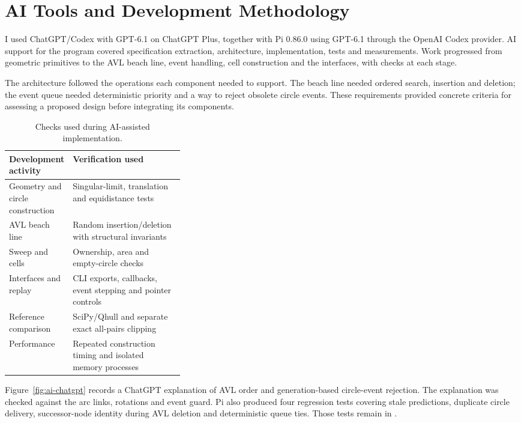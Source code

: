 \section{AI Tools and Development Methodology}
\label{sec:2}

I used ChatGPT/Codex with GPT-6.1 on ChatGPT Plus, together with Pi 0.86.0 using GPT-6.1 through the OpenAI Codex provider. AI support for the program covered specification extraction, architecture, implementation, tests and measurements. Work progressed from geometric primitives to the AVL beach line, event handling, cell construction and the interfaces, with checks at each stage.

The architecture followed the operations each component needed to support. The beach line needed ordered search, insertion and deletion; the event queue needed deterministic priority and a way to reject obsolete circle events. These requirements provided concrete criteria for assessing a proposed design before integrating its components.

\begin{table}[!htbp]
\centering
\caption{Checks used during AI-assisted implementation.}
\label{tab:1}
\begin{tabularx}{\linewidth}{@{}p{0.34\linewidth}X@{}}
\toprule
\textbf{Development activity} & \textbf{Verification used} \\
\midrule
Geometry and circle construction & Singular-limit, translation and equidistance tests \\
AVL beach line & Random insertion/deletion with structural invariants \\
Sweep and cells & Ownership, area and empty-circle checks \\
Interfaces and replay & CLI exports, callbacks, event stepping and pointer controls \\
Reference comparison & SciPy/Qhull and separate exact all-pairs clipping \\
Performance & Repeated construction timing and isolated memory processes \\
\bottomrule
\end{tabularx}
\end{table}

Figure~\ref{fig:ai-chatgpt} records a ChatGPT explanation of AVL order and generation-based circle-event rejection. The explanation was checked against the arc links, rotations and event guard. Pi also produced four regression tests covering stale predictions, duplicate circle delivery, successor-node identity during AVL deletion and deterministic queue ties. Those tests remain in .

